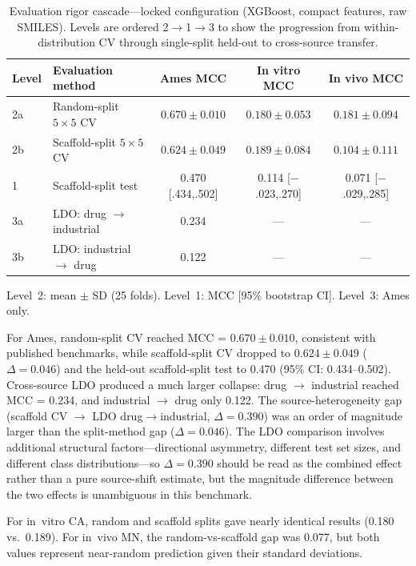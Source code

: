 \begin{table}[ht]
\caption{Evaluation rigor cascade---locked configuration (XGBoost, compact features, raw SMILES). Levels are ordered 2$\to$1$\to$3 to show the progression from within-distribution CV through single-split held-out to cross-source transfer.}
\label{tab:cascade}
\centering
\small
\begin{tabular}{@{}llccc@{}}
\toprule
Level & Evaluation method & Ames MCC & In vitro MCC & In vivo MCC \\
\midrule
2a & Random-split $5\!\times\!5$ CV & $0.670 \pm 0.010$ & $0.180 \pm 0.053$ & $0.181 \pm 0.094$ \\
2b & Scaffold-split $5\!\times\!5$ CV & $0.624 \pm 0.049$ & $0.189 \pm 0.084$ & $0.104 \pm 0.111$ \\
1 & Scaffold-split test & 0.470 [.434,.502] & 0.114 [$-$.023,.270] & 0.071 [$-$.029,.285] \\
3a & LDO: drug $\to$ industrial & 0.234 & --- & --- \\
3b & LDO: industrial $\to$ drug & 0.122 & --- & --- \\
\bottomrule
\end{tabular}

\medskip
\footnotesize
Level~2: mean $\pm$ SD (25 folds). Level~1: MCC [95\% bootstrap CI]. Level~3: Ames only.
\end{table}

For Ames, random-split CV reached MCC = $0.670 \pm 0.010$, consistent with published benchmarks,\cite{Hansen_2009,Li_2021} while scaffold-split CV dropped to $0.624 \pm 0.049$ ($\Delta = 0.046$) and the held-out scaffold-split test to 0.470 (95\% CI: 0.434--0.502). Cross-source LDO produced a much larger collapse: drug $\to$ industrial reached MCC = 0.234, and industrial $\to$ drug only 0.122. The source-heterogeneity gap (scaffold CV $\to$ LDO drug$\to$industrial, $\Delta = 0.390$) was an order of magnitude larger than the split-method gap ($\Delta = 0.046$). The LDO comparison involves additional structural factors---directional asymmetry, different test set sizes, and different class distributions---so $\Delta = 0.390$ should be read as the combined effect rather than a pure source-shift estimate, but the magnitude difference between the two effects is unambiguous in this benchmark.

For in~vitro CA, random and scaffold splits gave nearly identical results (0.180 vs.\ 0.189). For in~vivo MN, the random-vs-scaffold gap was 0.077, but both values represent near-random prediction given their standard deviations.

